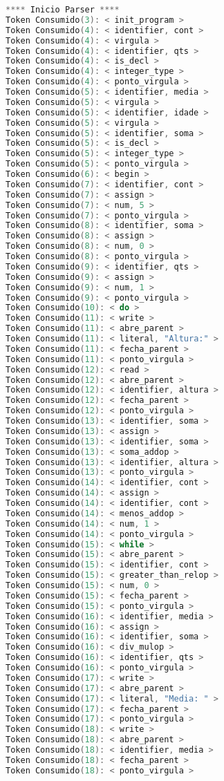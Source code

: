 \begin{lstlisting}[caption={Saida Correta para o Codigo de teste  : Teste3.txt},label={Entrada 1},language=C]
**** Inicio Parser ****
Token Consumido(3): < init_program >
Token Consumido(4): < identifier, cont >
Token Consumido(4): < virgula >
Token Consumido(4): < identifier, qts >
Token Consumido(4): < is_decl >
Token Consumido(4): < integer_type >
Token Consumido(4): < ponto_virgula >
Token Consumido(5): < identifier, media >
Token Consumido(5): < virgula >
Token Consumido(5): < identifier, idade >
Token Consumido(5): < virgula >
Token Consumido(5): < identifier, soma >
Token Consumido(5): < is_decl >
Token Consumido(5): < integer_type >
Token Consumido(5): < ponto_virgula >
Token Consumido(6): < begin >
Token Consumido(7): < identifier, cont >
Token Consumido(7): < assign >
Token Consumido(7): < num, 5 >
Token Consumido(7): < ponto_virgula >
Token Consumido(8): < identifier, soma >
Token Consumido(8): < assign >
Token Consumido(8): < num, 0 >
Token Consumido(8): < ponto_virgula >
Token Consumido(9): < identifier, qts >
Token Consumido(9): < assign >
Token Consumido(9): < num, 1 >
Token Consumido(9): < ponto_virgula >
Token Consumido(10): < do >
Token Consumido(11): < write >
Token Consumido(11): < abre_parent >
Token Consumido(11): < literal, "Altura:" >
Token Consumido(11): < fecha_parent >
Token Consumido(11): < ponto_virgula >
Token Consumido(12): < read >
Token Consumido(12): < abre_parent >
Token Consumido(12): < identifier, altura >
Token Consumido(12): < fecha_parent >
Token Consumido(12): < ponto_virgula >
Token Consumido(13): < identifier, soma >
Token Consumido(13): < assign >
Token Consumido(13): < identifier, soma >
Token Consumido(13): < soma_addop >
Token Consumido(13): < identifier, altura >
Token Consumido(13): < ponto_virgula >
Token Consumido(14): < identifier, cont >
Token Consumido(14): < assign >
Token Consumido(14): < identifier, cont >
Token Consumido(14): < menos_addop >
Token Consumido(14): < num, 1 >
Token Consumido(14): < ponto_virgula >
Token Consumido(15): < while >
Token Consumido(15): < abre_parent >
Token Consumido(15): < identifier, cont >
Token Consumido(15): < greater_than_relop >
Token Consumido(15): < num, 0 >
Token Consumido(15): < fecha_parent >
Token Consumido(15): < ponto_virgula >
Token Consumido(16): < identifier, media >
Token Consumido(16): < assign >
Token Consumido(16): < identifier, soma >
Token Consumido(16): < div_mulop >
Token Consumido(16): < identifier, qts >
Token Consumido(16): < ponto_virgula >
Token Consumido(17): < write >
Token Consumido(17): < abre_parent >
Token Consumido(17): < literal, "Media: " >
Token Consumido(17): < fecha_parent >
Token Consumido(17): < ponto_virgula >
Token Consumido(18): < write >
Token Consumido(18): < abre_parent >
Token Consumido(18): < identifier, media >
Token Consumido(18): < fecha_parent >
Token Consumido(18): < ponto_virgula >
\end{lstlisting}\newline




